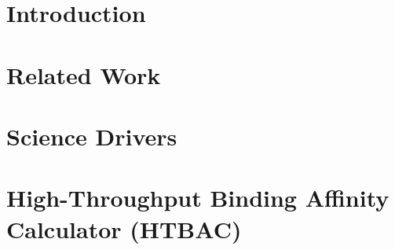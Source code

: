 \documentclass[conference]{IEEEtran}
\begin{document}

\section{Introduction}\label{sec:intro}



\section{Related Work}\label{sec:related-work}



\section{Science Drivers}\label{sec:science-drivers}




\section{High-Throughput Binding Affinity Calculator
(HTBAC)}\label{sec:htbac}



% 
\end{document}
